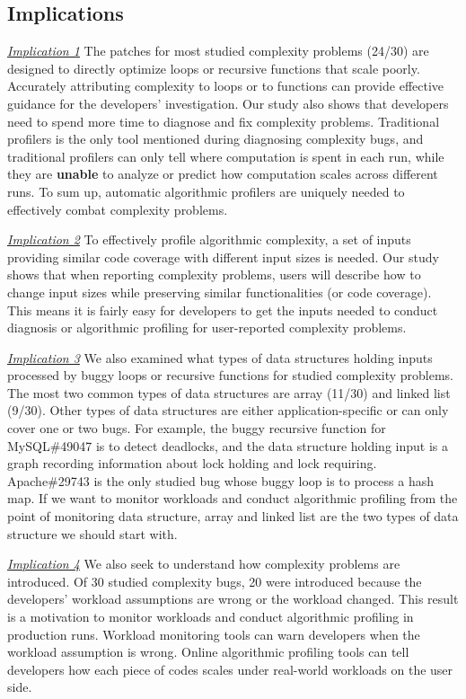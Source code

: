 {{\subsection{Implications}

{\underline{\textit{Implication 1}}
The patches for most studied complexity problems (24/30)
are designed to directly optimize loops or recursive functions that scale poorly.
Accurately attributing complexity to loops or to functions can provide 
effective guidance for the developers' investigation. 
Our study also shows that developers need to spend more time to 
diagnose and fix complexity problems.
Traditional profilers is the only tool mentioned during diagnosing complexity bugs, 
and traditional profilers can only tell where computation is spent in each run, 
while they are {\bf unable} to analyze or predict how computation scales across different runs.
To sum up, automatic algorithmic profilers are uniquely needed to effectively combat complexity problems.  

{\underline{\textit{Implication 2}}
To effectively profile algorithmic complexity,
a set of inputs providing similar code coverage with different input sizes is needed. 
Our study shows that when reporting complexity problems,
users will describe how to change input sizes 
while preserving similar functionalities (or code coverage). 
This means it is fairly easy for developers to get the inputs needed 
to conduct diagnosis or algorithmic profiling for user-reported complexity problems. 

{\underline{\textit{Implication 3}}}
We also examined what types of data structures holding inputs processed 
by buggy loops or recursive functions for studied complexity problems.
The most two common types of data structures 
are array (11/30) and linked list (9/30).
Other types of data structures are either application-specific or 
can only cover one or two bugs.
For example, the buggy recursive function for MySQL\#49047 is to detect deadlocks,
and the data structure holding input is a graph recording information about lock holding and lock requiring. 
Apache\#29743 is the only studied bug whose buggy loop is to process a hash map. 
If we want to monitor workloads and conduct algorithmic profiling from the point of monitoring data structure, 
array and linked list are the two types of data structure we should start with.

{\underline{\textit{Implication 4}}
We also seek to understand how complexity problems are introduced. 
Of 30 studied complexity bugs, 20 were introduced 
because the developers' workload assumptions are wrong or the workload changed. 
This result is a motivation to monitor workloads and conduct algorithmic profiling in production runs. 
Workload monitoring tools can warn developers when the workload assumption is wrong.
Online algorithmic profiling tools can tell developers 
how each piece of codes scales under real-world workloads on the user side.  

}}}}}
